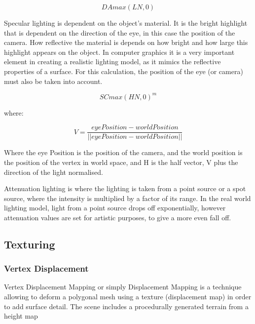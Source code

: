 \documentclass[conference]{acmsiggraph}
\begin{document}
\begin{equation} \label{diffuseLightingEq}
    DA max(L N, 0)
\end{equation}

Specular lighting is dependent on the object's material. It is the bright highlight that is dependent on the direction of the eye, in this case the position of the camera. How reflective the material is depends on how bright and how large this highlight appears on the object. In computer graphics it is a very important element in creating a realistic lighting model, as it mimics the reflective properties of a surface. %
For this calculation, the position of the eye (or camera) must also be taken into account. 

\begin{equation} \label{specularLightingEq}
    SC max(H N, 0)^m
\end{equation}

where:

\begin{equation} \label{halfVector}
    V = \frac{eyePosition - worldPosition}{||eyePosition - worldPosition||}
\end{equation}

Where the eye Position is the position of the camera, and the world position is the position of the vertex in world space, and H is the half vector, V plus the direction of the light normalised.

Attenuation lighting is where the lighting is taken from a point source or a spot source, where the intensity is multiplied by a factor of its range. In the real world lighting model, light from a point source drops off exponentially, however attenuation values are set for artistic purposes, to give a more even fall off. 

\subsection{Texturing}

\subsubsection{Vertex Displacement}

Vertex Displacement Mapping or simply Displacement Mapping is a technique allowing to deform a polygonal mesh using a texture (displacement map) in order to add surface detail. The scene includes a procedurally generated terrain from a height map %
\end{document}
